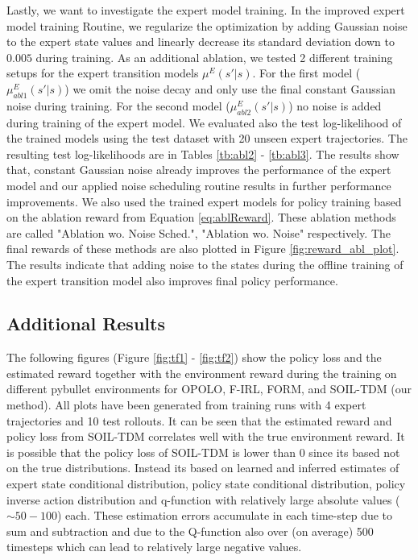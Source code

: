 \documentclass{article}
\begin{document}
Lastly, we want to investigate the expert model training. In the improved expert model training Routine, we regularize the optimization by adding Gaussian noise to the expert state values and linearly decrease its standard deviation down to $0.005$ during training. As an additional ablation, we tested 2 different training setups for the expert transition models $\mu^E(s'|s)$. For the first model ($\mu_{abl1}^E(s'|s)$) we omit the noise decay and only use the final constant Gaussian noise during training. For the second model ($\mu_{abl2}^E(s'|s)$) no noise is added during training of the expert model. We evaluated also the test log-likelihood of the trained models using the test dataset with 20 unseen expert trajectories. The resulting test log-likelihoods are in Tables \ref{tb:abl2} - \ref{tb:abl3}. The results show that, constant Gaussian noise already improves the performance of the expert model and our applied noise scheduling routine results in further performance improvements. We also used the trained expert models for policy training based on the ablation reward from Equation \ref{eq:ablReward}. These ablation methods are called "Ablation wo. Noise Sched.", "Ablation wo. Noise" respectively. The final rewards of these methods are also plotted in Figure \ref{fig:reward_abl_plot}. The results indicate that adding noise to the states during the offline training of the expert transition model also improves final policy performance. 


\subsection{Additional Results}\label{sec:addRes}

The following figures (Figure \ref{fig:tf1} - \ref{fig:tf2}) show the policy loss and the estimated reward together with the environment reward during the training on different pybullet environments for OPOLO, F-IRL, FORM, and SOIL-TDM (our method). All plots have been generated from training runs with 4 expert trajectories and 10 test rollouts. It can be seen that the estimated reward and policy loss from SOIL-TDM correlates well with the true environment reward. It is possible that the policy loss of SOIL-TDM is lower than 0 since its based not on the true distributions. Instead its based on learned and inferred estimates of expert state conditional distribution, policy state conditional distribution, policy inverse action distribution and q-function with relatively large absolute values ($\sim50-100$) each. These estimation errors accumulate in each time-step due to sum and subtraction and due to the Q-function also over (on average) 500 timesteps which can lead to relatively large negative values.
\end{document}
